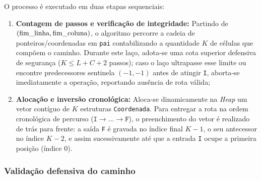 \documentclass[12pt,a4paper]{article}
\makeatletter
\DeclareRobustCommand{\_}{%
  \ifmmode
    \nfss@text{\textunderscore}%
  \else
    \textunderscore\allowbreak
  \fi
}
\makeatother
\begin{document}
O processo é executado em duas etapas sequenciais:
\begin{enumerate}
    \item \textbf{Contagem de passos e verificação de integridade:} Partindo de $(\text{fim\_linha}, \text{fim\_coluna})$, o algoritmo percorre a cadeia de ponteiros/coordenadas em \texttt{pai} contabilizando a quantidade $K$ de células que compõem o caminho. Durante este laço, adota-se uma cota superior defensiva de segurança ($K \le L + C + 2$ passos); caso o laço ultrapasse esse limite ou encontre predecessores sentinela $(-1,-1)$ antes de atingir \texttt{I}, aborta-se imediatamente a operação, reportando ausência de rota válida;
    \item \textbf{Alocação e inversão cronológica:} Aloca-se dinamicamente na \textit{Heap} um vetor contíguo de $K$ estruturas \texttt{Coordenada}. Para entregar a rota na ordem cronológica de percurso ($\texttt{I} \to \dots \to \texttt{F}$), o preenchimento do vetor é realizado de trás para frente: a saída \texttt{F} é gravada no índice final $K-1$, o seu antecessor no índice $K-2$, e assim sucessivamente até que a entrada \texttt{I} ocupe a primeira posição (índice $0$).
\end{enumerate}

\subsubsection*{Validação defensiva do caminho}
\end{document}
